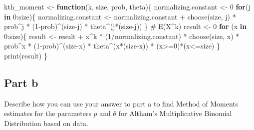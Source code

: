 \documentclass[
]{article}
\newenvironment{Shaded}{\begin{snugshade}}{\end{snugshade}}
\newcommand{\CommentTok}[1]{\textcolor[rgb]{0.37,0.37,0.37}{#1}}
\newcommand{\ControlFlowTok}[1]{\textcolor[rgb]{0.00,0.23,0.31}{\textbf{#1}}}
\newcommand{\DecValTok}[1]{\textcolor[rgb]{0.68,0.00,0.00}{#1}}
\newcommand{\FunctionTok}[1]{\textcolor[rgb]{0.28,0.35,0.67}{#1}}
\newcommand{\NormalTok}[1]{\textcolor[rgb]{0.00,0.23,0.31}{#1}}
\newcommand{\OtherTok}[1]{\textcolor[rgb]{0.00,0.23,0.31}{#1}}
\newcommand{\SpecialCharTok}[1]{\textcolor[rgb]{0.37,0.37,0.37}{#1}}
\begin{document}
\begin{Shaded}
\begin{Highlighting}[numbers=left,,]
\NormalTok{kth\_moment }\OtherTok{\textless{}{-}} \ControlFlowTok{function}\NormalTok{(k, size, prob, theta)\{}
\NormalTok{  normalizing.constant }\OtherTok{\textless{}{-}} \DecValTok{0}
  \ControlFlowTok{for}\NormalTok{(j }\ControlFlowTok{in} \DecValTok{0}\SpecialCharTok{:}\NormalTok{size)\{}
\NormalTok{    normalizing.constant }\OtherTok{\textless{}{-}}\NormalTok{ normalizing.constant }\SpecialCharTok{+} 
      \FunctionTok{choose}\NormalTok{(size, j) }\SpecialCharTok{*}\NormalTok{ prob}\SpecialCharTok{\^{}}\NormalTok{j }\SpecialCharTok{*}\NormalTok{ (}\DecValTok{1}\SpecialCharTok{{-}}\NormalTok{prob)}\SpecialCharTok{\^{}}\NormalTok{(size}\SpecialCharTok{{-}}\NormalTok{j) }\SpecialCharTok{*}\NormalTok{ theta}\SpecialCharTok{\^{}}\NormalTok{(j}\SpecialCharTok{*}\NormalTok{(size}\SpecialCharTok{{-}}\NormalTok{j))}
\NormalTok{  \}}
  \CommentTok{\# E(X\^{}k)}
\NormalTok{  result }\OtherTok{\textless{}{-}} \DecValTok{0}
  \ControlFlowTok{for}\NormalTok{ (x }\ControlFlowTok{in} \DecValTok{0}\SpecialCharTok{:}\NormalTok{size)\{}
\NormalTok{    result }\OtherTok{\textless{}{-}}\NormalTok{ result }\SpecialCharTok{+} 
\NormalTok{    x}\SpecialCharTok{\^{}}\NormalTok{k }\SpecialCharTok{*}\NormalTok{ (}\DecValTok{1}\SpecialCharTok{/}\NormalTok{normalizing.constant) }\SpecialCharTok{*}
    \FunctionTok{choose}\NormalTok{(size, x) }\SpecialCharTok{*}\NormalTok{ prob}\SpecialCharTok{\^{}}\NormalTok{x }\SpecialCharTok{*}\NormalTok{ (}\DecValTok{1}\SpecialCharTok{{-}}\NormalTok{prob)}\SpecialCharTok{\^{}}\NormalTok{(size}\SpecialCharTok{{-}}\NormalTok{x) }\SpecialCharTok{*}\NormalTok{ theta}\SpecialCharTok{\^{}}\NormalTok{(x}\SpecialCharTok{*}\NormalTok{(size}\SpecialCharTok{{-}}\NormalTok{x)) }\SpecialCharTok{*}
\NormalTok{      (x}\SpecialCharTok{\textgreater{}=}\DecValTok{0}\NormalTok{)}\SpecialCharTok{*}\NormalTok{(x}\SpecialCharTok{\textless{}=}\NormalTok{size)}
\NormalTok{  \}}
  \FunctionTok{print}\NormalTok{(result)}
\NormalTok{  \}}
\end{Highlighting}
\end{Shaded}

\normalsize

\subsection{Part b}\label{part-b-1}

Describe how you can use your answer to part a to find Method of Moments
estimates for the parameters \(p\) and \(\theta\) for Altham's
Multiplicative Binomial Distribution based on data.
\end{document}
